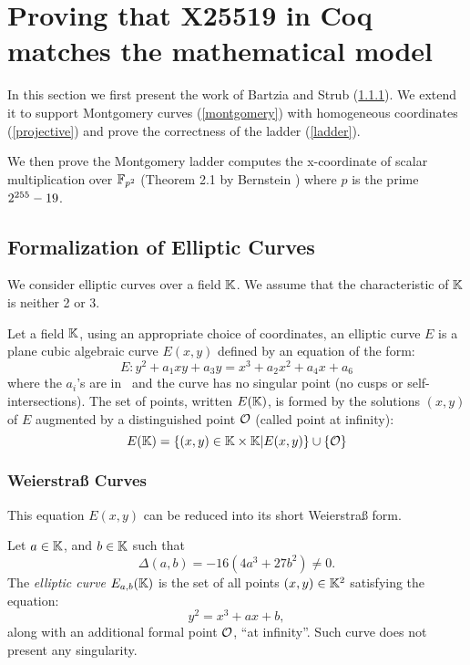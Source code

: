 \section{Proving that X25519 in Coq matches the mathematical model}
\label{sec3-maths}

In this section we first present the work of Bartzia and Strub \cite{DBLP:conf/itp/BartziaS14} (\ref{Weierstrass}).
We extend it to support Montgomery curves (\ref{montgomery}) with homogeneous coordinates (\ref{projective}) and prove the correctness of the ladder (\ref{ladder}).

We then prove the Montgomery ladder computes
the x-coordinate of scalar multiplication over $\mathbb{F}_{p^2}$
(Theorem 2.1 by Bernstein \cite{Ber06}) where $p$ is the prime $2^{255}-19$.

\subsection{Formalization of Elliptic Curves}

We consider elliptic curves over a field $\mathbb{K}$. We assume that the
characteristic of $\mathbb{K}$ is neither 2 or 3.

\begin{definition}
Let a field $\mathbb{K}$, using an appropriate choice of coordinates, an elliptic curve $E$
is a plane cubic algebraic curve $E(x,y)$ defined by an equation of the form:
$$E : y^2 + a_1 xy + a_3 y = x^3 + a_2 x^2 + a_4 x + a_6$$
where the $a_i$'s are in \K\ and the curve has no singular point (\ie no cusps
or self-intersections). The set of points, written $E(\mathbb{K})$, is formed by the
solutions $(x,y)$ of $E$ augmented by a distinguished point $\mathcal{O}$ (called point at infinity):
$$E(\mathbb{K}) = \{(x,y) \in \mathbb{K} \times \mathbb{K} | E(x,y)\} \cup \{\mathcal{O}\}$$
\end{definition}

\subsubsection{Weierstra{\ss} Curves}
\label{Weierstrass}
This equation $E(x,y)$ can be reduced into its short Weierstra{\ss} form.

\begin{definition}
Let $a \in \mathbb{K}$, and $b \in \mathbb{K}$ such that $$\Delta(a,b) = -16(4a^3 + 27b^2) \neq 0.$$
The \textit{elliptic curve} $E_{a,b}(\mathbb{K})$ is the set of all points $(x,y) \in \mathbb{K}^2$ satisfying the equation:
$$y^2 = x^3 + ax + b,$$
along with an additional formal point $\mathcal{O}$, ``at infinity''. Such curve does not present any singularity.
\end{definition}

